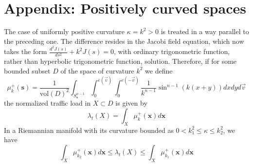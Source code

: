 \documentclass{article}
\newcommand{\s}{{\mathbf s}}
\newcommand{\x}{{\mathbf x}}
\newcommand{\vol}{\mathrm{vol}}
\begin{document}
\section{Appendix: Positively curved spaces}
\label{s:app_positive}

The case of uniformly positive curvature $\kappa=k^2>0$ is treated in a way parallel to the preceding one. 
The difference resides in the Jacobi field equation, 
which now takes the form $\frac{d^2 J(s)}{ds^2}+k^2J(s)=0$,  
with ordinary trigonometric function, rather than hyperbolic trigonometric function, solution. 
Therefore, if for some bounded subset $D$ of the space of curvature $k^2$ we define 
\begin{equation}
\label{e:mu_k_plus}
\mu^+_k(\s)=\frac{1}{\vol(D)^2}\int_{S^{n-1}_\s}\int_0^{e(\vec{v})}\int_0^{e(-\vec{v})} \frac{1}{k^{n-1}}\sin^{n-1}(k(x+y))dxdyd\vec{v} 
\end{equation}
the normalized traffic load in $X \subset D$ is given by
$$ \lambda_t(X)=\int_X \mu^+_k(\x)d\x $$
In a Riemannian manifold with its curvature bounded as $0< k_1^2 \leq \kappa \leq k_2^2$, we have 
$$ \int_X \mu^+_{k_2}(\x)d\x \leq \lambda_t(X) \leq \int_X \mu^+_{k_1}(\x)d\x $$









%
 
\end{document}
